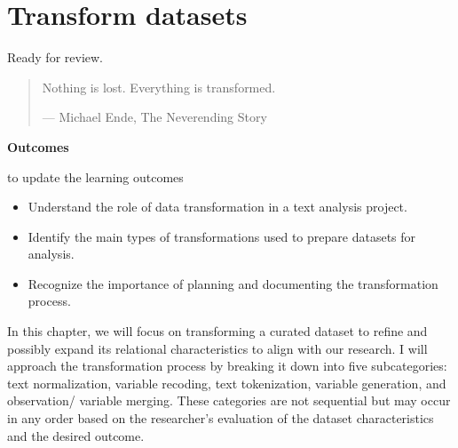 \documentclass[
  letterpaper,
  DIV=11,
  numbers=noendperiod]{scrreport}
\providecommand{\tightlist}{%
  \setlength{\itemsep}{0pt}\setlength{\parskip}{0pt}}\usepackage{longtable,booktabs,array}
\theoremstyle{definition}
\theoremstyle{remark}
\begin{document}
\hypertarget{sec-transform-datasets}{%
\chapter{Transform datasets}\label{sec-transform-datasets}}

\begin{tcolorbox}[enhanced jigsaw, breakable, colback=white, opacitybacktitle=0.6, coltitle=black, left=2mm, toptitle=1mm, titlerule=0mm, arc=.35mm, title=\textcolor{quarto-callout-tip-color}{\faLightbulb}\hspace{0.5em}{Draft}, rightrule=.15mm, colframe=quarto-callout-tip-color-frame, bottomtitle=1mm, colbacktitle=quarto-callout-tip-color!10!white, toprule=.15mm, leftrule=.75mm, bottomrule=.15mm, opacityback=0]

Ready for review.

\end{tcolorbox}

\begin{quote}
Nothing is lost. Everything is transformed.

--- Michael Ende, The Neverending Story
\end{quote}

\begin{tcolorbox}[enhanced jigsaw, breakable, colback=white, rightrule=.15mm, arc=.35mm, left=2mm, toprule=.15mm, leftrule=.75mm, bottomrule=.15mm, opacityback=0]

\textbf{ Outcomes}

 to update the learning outcomes

\begin{itemize}
\tightlist
\item
  Understand the role of data transformation in a text analysis project.
\item
  Identify the main types of transformations used to prepare datasets
  for analysis.
\item
  Recognize the importance of planning and documenting the
  transformation process.
\end{itemize}

\end{tcolorbox}

In this chapter, we will focus on transforming a curated dataset to
refine and possibly expand its relational characteristics to align with
our research. I will approach the transformation process by breaking it
down into five subcategories: text normalization, variable recoding,
text tokenization, variable generation, and observation/ variable
merging. These categories are not sequential but may occur in any order
based on the researcher's evaluation of the dataset characteristics and
the desired outcome.
\end{document}
